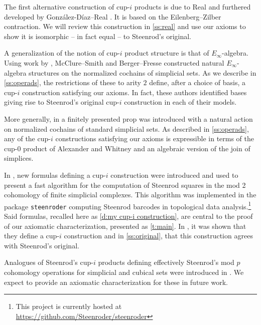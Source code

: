 The first alternative construction of cup-$i$ products is due to Real \cite{real1996computability} and furthered developed by Gonz\'alez-D\'iaz--Real \cite{gonzalez-diaz1999steenrod}.
It is based on the Eilenberg--Zilber contraction.
We will review this construction in \cref{ss:real} and use our axioms to show it is isomorphic -- in fact equal -- to Steenrod's original.

A generalization of the notion of cup-$i$ product structure is that of $E_\infty$-algebra.
Using work by \cite[]{benson1998representations}, McClure--Smith \cite{mcclure2003multivariable} and Berger--Fresse \cite{berger2004combinatorial} constructed natural $E_\infty$-algebra structures on the normalized cochains of simplicial sets.
As we describe in \cref{ss:operads}, the restrictions of these to arity $2$ define, after a choice of basis,
a cup-$i$ construction satisfying our axioms.
In fact, these authors identified bases giving rise to Steenrod's original cup-$i$ construction in each of their models.

More generally, in \cite{medina2020prop1} a finitely presented prop was introduced with a natural action on normalized cochains of standard simplicial sets.
As described in \cref{ss:operads}, any of the cup-$i$ constructions satisfying our axioms is expressible in terms of the cup-$0$ product of Alexander and Whitney and an algebraic version of the join of simplices.

In \cite{medina2021fast_sq}, new formulas defining a cup-$i$ construction were introduced and used to present a fast algorithm for the computation of Steenrod squares in the mod 2 cohomology of finite simplicial complexes.
This algorithm was implemented in the package \texttt{steenroder} computing Steenrod barcodes \cite{medina2018persistence} in topological data analysis.\footnote{This project is currently hosted at \url{https://github.com/Steenroder/steenroder}}
Said formulas, recalled here as \cref{d:my cup-i construction}, are central to the proof of our axiomatic characterization, presented as \cref{t:main}.
In \cite{medina2021fast_sq}, it was shown that they define a cup-$i$ construction and in \cref{ss:original}, that this construction agrees with Steenrod's original.

Analogues of Steenrod's cup-$i$ products defining effectively Steenrod's mod $p$ cohomology operations for simplicial and cubical sets were introduced in \cite{medina2021may_st}.
We expect to provide an axiomatic characterization for these in future work.

